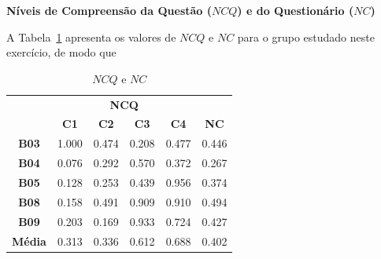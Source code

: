\textbf{Níveis de Compreensão da Questão ($NCQ$) e do Questionário ($NC$)}

A Tabela~\ref{tab:F3_A5_NCQ} apresenta os valores de $NCQ$ e $NC$ para o grupo estudado neste exercício, de modo que


\begin{table}[htbp]
	\centering
	\caption{$NCQ$ e $NC$}
	\begin{tabular}{|c|cccc|c|}
		\hline
		\rowcolor[HTML]{D9D9D9} 
		\cellcolor[HTML]{D9D9D9} & \multicolumn{4}{c|}{\cellcolor[HTML]{D9D9D9}\textbf{NCQ}} & \cellcolor[HTML]{D9D9D9} \\ \cline{2-5}
		\rowcolor[HTML]{D9D9D9} 
		\multirow{-2}{*}{\cellcolor[HTML]{D9D9D9}\textbf{Participante}} & \multicolumn{1}{c|}{\cellcolor[HTML]{D9D9D9}\textbf{C1}} & \multicolumn{1}{c|}{\cellcolor[HTML]{D9D9D9}\textbf{C2}} & \multicolumn{1}{c|}{\cellcolor[HTML]{D9D9D9}\textbf{C3}} & \textbf{C4} & \multirow{-2}{*}{\cellcolor[HTML]{D9D9D9}\textbf{NC}} \\ \hline
		\rowcolor[HTML]{FFFFFF} 
		\textbf{B03} & \multicolumn{1}{c|}{\cellcolor[HTML]{FFFFFF}1.000} & \multicolumn{1}{c|}{\cellcolor[HTML]{FFFFFF}0.474} & \multicolumn{1}{c|}{\cellcolor[HTML]{FFFFFF}0.208} & 0.477 & 0.446 \\ \hline
		\rowcolor[HTML]{E7E6E6} 
		\textbf{B04} & \multicolumn{1}{c|}{\cellcolor[HTML]{E7E6E6}0.076} & \multicolumn{1}{c|}{\cellcolor[HTML]{E7E6E6}0.292} & \multicolumn{1}{c|}{\cellcolor[HTML]{E7E6E6}0.570} & 0.372 & 0.267 \\ \hline
		\rowcolor[HTML]{FFFFFF} 
		\textbf{B05} & \multicolumn{1}{c|}{\cellcolor[HTML]{FFFFFF}0.128} & \multicolumn{1}{c|}{\cellcolor[HTML]{FFFFFF}0.253} & \multicolumn{1}{c|}{\cellcolor[HTML]{FFFFFF}0.439} & 0.956 & 0.374 \\ \hline
		\rowcolor[HTML]{E7E6E6} 
		\textbf{B08} & \multicolumn{1}{c|}{\cellcolor[HTML]{E7E6E6}0.158} & \multicolumn{1}{c|}{\cellcolor[HTML]{E7E6E6}0.491} & \multicolumn{1}{c|}{\cellcolor[HTML]{E7E6E6}0.909} & 0.910 & 0.494 \\ \hline
		\rowcolor[HTML]{FFFFFF} 
		\textbf{B09} & \multicolumn{1}{c|}{\cellcolor[HTML]{FFFFFF}0.203} & \multicolumn{1}{c|}{\cellcolor[HTML]{FFFFFF}0.169} & \multicolumn{1}{c|}{\cellcolor[HTML]{FFFFFF}0.933} & 0.724 & 0.427 \\ \hline
		\rowcolor[HTML]{D9D9D9} 
		\textbf{Média} & \multicolumn{1}{c|}{\cellcolor[HTML]{D9D9D9}0.313} & \multicolumn{1}{c|}{\cellcolor[HTML]{D9D9D9}0.336} & \multicolumn{1}{c|}{\cellcolor[HTML]{D9D9D9}0.612} & 0.688 & 0.402 \\ \hline
	\end{tabular}
	\label{tab:F3_A5_NCQ}
\end{table}


